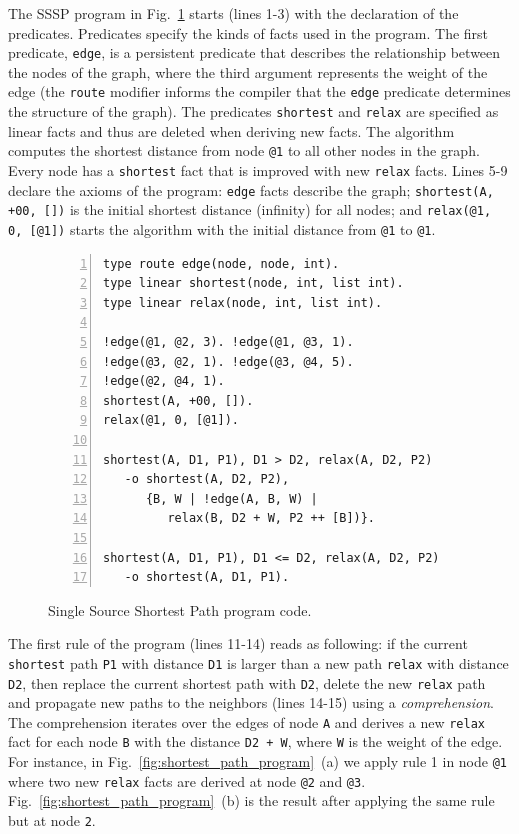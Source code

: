 The SSSP program in Fig.~\ref{code:shortest_path_program} starts (lines 1-3)
with the declaration of the predicates. Predicates specify the kinds of facts
used in the program. The first predicate, \texttt{edge}, is a persistent
predicate that describes the relationship between the nodes of the graph,
where the third argument represents the weight of the edge (the
\texttt{route} modifier informs the compiler that the \texttt{edge} predicate
determines the structure of the graph).
The predicates \texttt{shortest} and \texttt{relax} are
specified as linear facts and thus are deleted when deriving new facts.  The
algorithm computes the shortest distance from node
\texttt{@1} to all other nodes in the graph. Every node has a
\texttt{shortest} fact that is improved with new \texttt{relax} facts.  Lines
5-9 declare the axioms of the program: \texttt{edge} facts describe the
graph; \texttt{shortest(A, +00, [])} is the initial shortest distance
(infinity) for all nodes; and \texttt{relax(@1, 0, [@1])} starts the
algorithm with the initial distance from \texttt{@1} to \texttt{@1}.

\begin{figure}[h!]
\scriptsize\begin{Verbatim}[numbers=left]
type route edge(node, node, int).
type linear shortest(node, int, list int).
type linear relax(node, int, list int).

!edge(@1, @2, 3). !edge(@1, @3, 1).
!edge(@3, @2, 1). !edge(@3, @4, 5).
!edge(@2, @4, 1).
shortest(A, +00, []).
relax(@1, 0, [@1]).

shortest(A, D1, P1), D1 > D2, relax(A, D2, P2)
   -o shortest(A, D2, P2),
      {B, W | !edge(A, B, W) |
         relax(B, D2 + W, P2 ++ [B])}.

shortest(A, D1, P1), D1 <= D2, relax(A, D2, P2)
   -o shortest(A, D1, P1).
\end{Verbatim}
  \caption{Single Source Shortest Path program code.}
  \label{code:shortest_path_program}
\end{figure}
\normalsize

The first rule of the program (lines 11-14) reads as following: if the current
\texttt{shortest} path \texttt{P1} with distance \texttt{D1} is larger
than a new path \texttt{relax} with distance \texttt{D2}, then replace the
current shortest path with \texttt{D2}, delete the new \texttt{relax} path and
propagate new paths to the neighbors (lines 14-15) using a \emph{comprehension}.
The comprehension iterates over the edges of node \texttt{A} and derives a new
\texttt{relax} fact for each node \texttt{B} with the distance \texttt{D2 + W},
where \texttt{W} is the weight of the edge. For
instance, in Fig.~\ref{fig:shortest_path_program}~(a) we apply rule 1 in node
\texttt{@1} where two new \texttt{relax} facts are derived at node \texttt{@2}
and \texttt{@3}. Fig.~\ref{fig:shortest_path_program}~(b) is the result after
applying the same rule but at node \texttt{2}.

